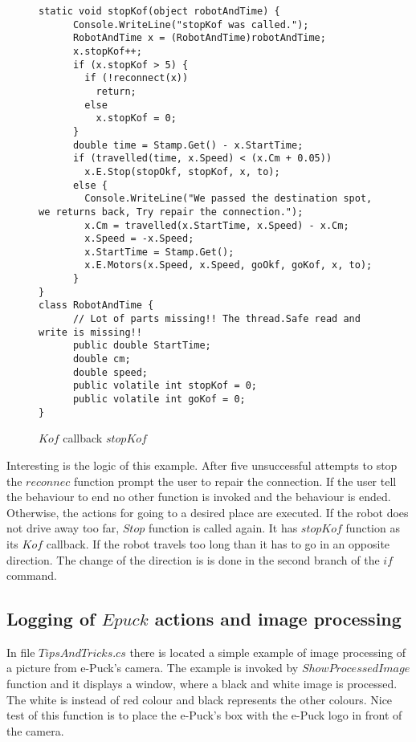 \begin{figure}[!hbp]
\begin{lstlisting}
static void stopKof(object robotAndTime) {
      Console.WriteLine("stopKof was called.");
      RobotAndTime x = (RobotAndTime)robotAndTime;
      x.stopKof++;
      if (x.stopKof > 5) {
        if (!reconnect(x))
          return;
        else
          x.stopKof = 0;
      }
      double time = Stamp.Get() - x.StartTime;
      if (travelled(time, x.Speed) < (x.Cm + 0.05))
        x.E.Stop(stopOkf, stopKof, x, to);
      else {
        Console.WriteLine("We passed the destination spot, we returns back, Try repair the connection.");
        x.Cm = travelled(x.StartTime, x.Speed) - x.Cm;
        x.Speed = -x.Speed;
        x.StartTime = Stamp.Get();
        x.E.Motors(x.Speed, x.Speed, goOkf, goKof, x, to);
      }
}
class RobotAndTime {
      // Lot of parts missing!! The thread.Safe read and write is missing!!
      public double StartTime;
      double cm;
      double speed;
      public volatile int stopKof = 0;
      public volatile int goKof = 0;
}

\end{lstlisting}
\caption{$Kof$ callback $stopKof$} \label{stopKof}
\end{figure}
	Interesting is the logic of this example. After five unsuccessful attempts to stop the $reconnec$ function
	prompt the user to repair the connection. 
	If the user tell the behaviour to end no other function is invoked and the behaviour is ended.
	Otherwise, the actions for going to a desired place are executed.
	If the robot does not drive away too far, $Stop$ function is called again.
	It has $stopKof$ function as its $Kof$ callback.
	If the robot travels too long than it has to go in an opposite direction.
	The change of the direction is is done in the second branch of the $if$ command.


\subsection{Logging of $Epuck$ actions and image processing}\label{sec:logging}
	In file $TipsAndTricks.cs$ there is located a simple example of image processing 
	of a picture from e-Puck's camera.
	The example is invoked by $ShowProcessedImage$ function and it displays a window, 
	where a black and white image is processed.
	The white is instead of red colour and black represents the other colours. Nice test of this function is to place
	the e-Puck's box with the e-Puck logo in front of the camera. 

